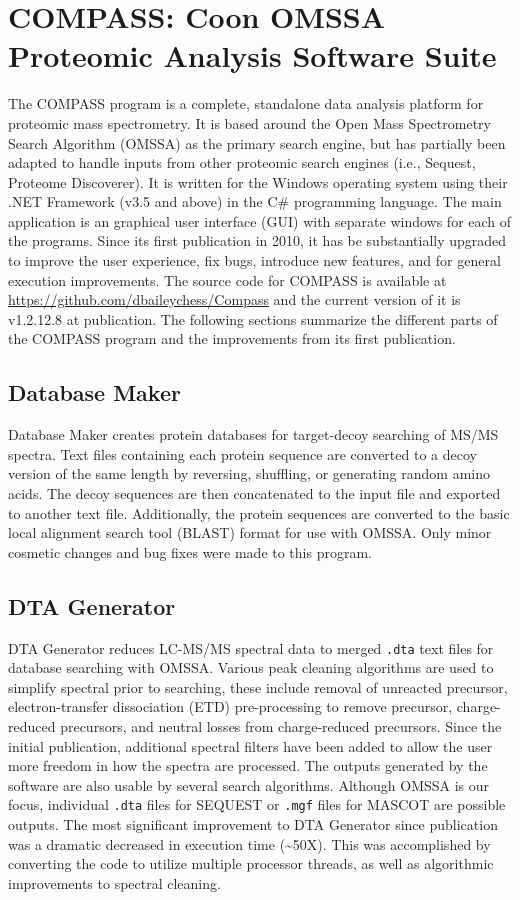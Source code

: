 \section{COMPASS: Coon OMSSA Proteomic Analysis Software Suite}
The COMPASS program is a complete, standalone data analysis platform for proteomic mass spectrometry. It is based around the Open Mass Spectrometry Search Algorithm (OMSSA) as the primary search engine, but has partially been adapted to handle inputs from other proteomic search engines (i.e., Sequest, Proteome Discoverer). It is written for the Windows operating system using their .NET Framework (v3.5 and above) in the C\# programming language. The main application is an graphical user interface (GUI) with separate windows for each of the programs. Since its first publication in 2010, it has be substantially upgraded to improve the user experience, fix bugs, introduce new features, and for general execution improvements. The source code for COMPASS is available at \url{https://github.com/dbaileychess/Compass} and the current version of it is v1.2.12.8 at publication. The following sections summarize the different parts of the COMPASS program and the improvements from its first publication. 

\subsection*{Database Maker}
Database Maker creates protein databases for target-decoy searching of MS/MS spectra. Text files containing each protein sequence are converted to a decoy version of the same length by reversing, shuffling, or generating random amino acids. The decoy sequences are then concatenated to the input file and exported to another text file. Additionally, the protein sequences are converted to the basic local alignment search tool (BLAST) format for use with OMSSA. Only minor cosmetic changes and bug fixes were made to this program.

\subsection*{DTA Generator}
DTA Generator reduces LC-MS/MS spectral data to merged \texttt{.dta} text files for database searching with OMSSA. Various peak cleaning algorithms are used to simplify spectral prior to searching, these include removal of unreacted precursor, electron-transfer dissociation (ETD) pre-processing to remove precursor, charge-reduced precursors, and neutral losses from charge-reduced precursors. Since the initial publication, additional spectral filters have been added to allow the user more freedom in how the spectra are processed. The outputs generated by the software are also usable by several search algorithms. Although OMSSA is our focus, individual \texttt{.dta} files for SEQUEST or \texttt{.mgf} files for MASCOT are possible outputs. The most significant improvement to DTA Generator since publication was a dramatic decreased in execution time (\textasciitilde50X). This was accomplished by converting the code to utilize multiple processor threads, as well as algorithmic improvements to spectral cleaning. 

